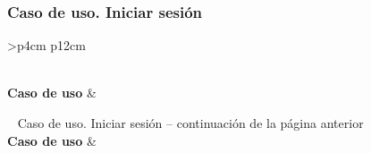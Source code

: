 \subsubsection{Caso de uso. Iniciar sesión} \label{sec:cu_inicio-sesion}
\begin{longtable}{
    >{}p{4cm}
    p{12cm}
    }
    \caption{Caso de uso. Iniciar sesión} \label{table:cu_inicio-sesion} \\
    \toprule
    \textbf{Caso de uso} &  \\
    \endfirsthead
    
    {{ \tablename\ \thetable{} Caso de uso. Iniciar sesión -- continuación de la página anterior}} \\
    \toprule
    \textbf{Caso de uso} &  \\
    \midrule
    \endhead
    
    \midrule
     \\ 
    \endfoot
    
    \bottomrule
    \endlastfoot
    

\end{longtable}
